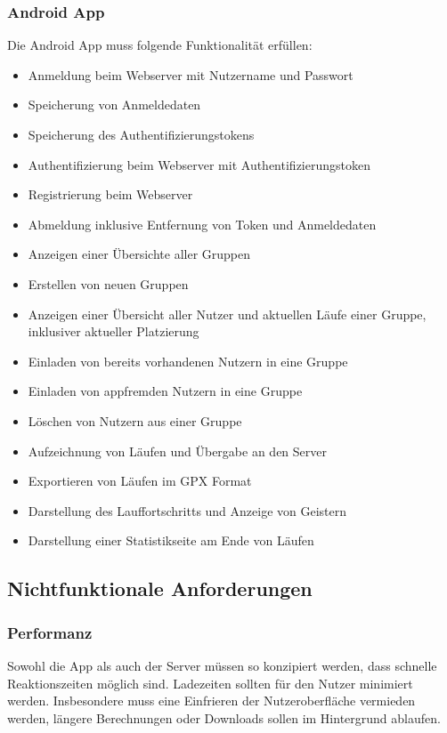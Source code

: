 \subsubsection{Android App}
Die Android App muss folgende Funktionalität erfüllen:
\begin{itemize}
\item Anmeldung beim Webserver mit Nutzername und Passwort
\item Speicherung von Anmeldedaten
\item Speicherung des Authentifizierungstokens
\item Authentifizierung beim Webserver mit Authentifizierungstoken
\item Registrierung beim Webserver
\item Abmeldung inklusive Entfernung von Token und Anmeldedaten
\item Anzeigen einer Übersichte aller Gruppen
\item Erstellen von neuen Gruppen
\item Anzeigen einer Übersicht aller Nutzer und aktuellen Läufe einer Gruppe, inklusiver aktueller Platzierung
\item Einladen von bereits vorhandenen Nutzern in eine Gruppe
\item Einladen von appfremden Nutzern in eine Gruppe
\item Löschen von Nutzern aus einer Gruppe
\item Aufzeichnung von Läufen und Übergabe an den Server
\item Exportieren von Läufen im GPX Format
\item Darstellung des Lauffortschritts und Anzeige von Geistern
\item Darstellung einer Statistikseite am Ende von Läufen
\end{itemize}
\subsection{Nichtfunktionale Anforderungen}
\subsubsection{Performanz}
Sowohl die App als auch der Server müssen so konzipiert werden, dass schnelle Reaktionszeiten möglich sind. Ladezeiten sollten für den Nutzer minimiert werden. Insbesondere muss eine Einfrieren der Nutzeroberfläche vermieden werden, längere Berechnungen oder Downloads sollen im Hintergrund ablaufen.

